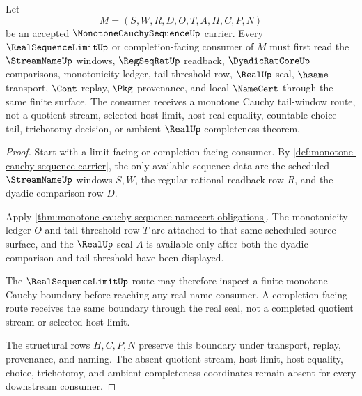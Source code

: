 \begin{theorem}
\label{thm:monotone-cauchy-sequence-tail-window}
Let
$$
M=(S,W,R,D,O,T,A,H,C,P,N)
$$
be an accepted $\MonotoneCauchySequenceUp$ carrier. Every $\RealSequenceLimitUp$ or completion-facing consumer of $M$ must first read the $\StreamNameUp$ windows, $\RegSeqRatUp$ readback, $\DyadicRatCoreUp$ comparisons, monotonicity ledger, tail-threshold row, $\RealUp$ seal, $\hsame$ transport, $\Cont$ replay, $\Pkg$ provenance, and local $\NameCert$ through the same finite surface. The consumer receives a monotone Cauchy tail-window route, not a quotient stream, selected host limit, host real equality, countable-choice tail, trichotomy decision, or ambient $\RealUp$ completeness theorem.
\end{theorem}
\begin{proof}
Start with a limit-facing or completion-facing consumer. By \autoref{def:monotone-cauchy-sequence-carrier}, the only available sequence data are the scheduled $\StreamNameUp$ windows $S,W$, the regular rational readback row $R$, and the dyadic comparison row $D$.

Apply \autoref{thm:monotone-cauchy-sequence-namecert-obligations}. The monotonicity ledger $O$ and tail-threshold row $T$ are attached to that same scheduled source surface, and the $\RealUp$ seal $A$ is available only after both the dyadic comparison and tail threshold have been displayed.

The $\RealSequenceLimitUp$ route may therefore inspect a finite monotone Cauchy boundary before reaching any real-name consumer. A completion-facing route receives the same boundary through the real seal, not a completed quotient stream or selected host limit.

The structural rows $H,C,P,N$ preserve this boundary under transport, replay, provenance, and naming. The absent quotient-stream, host-limit, host-equality, choice, trichotomy, and ambient-completeness coordinates remain absent for every downstream consumer.
\end{proof}


